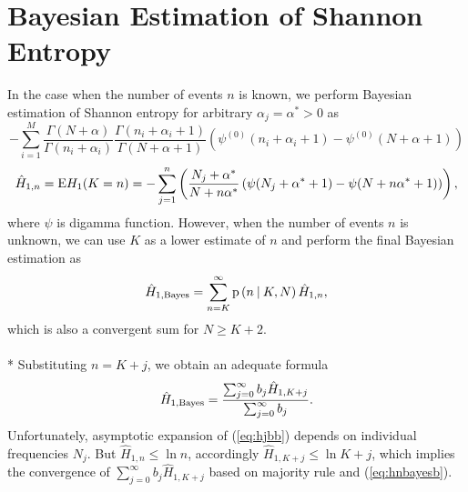 \section {Bayesian Estimation of Shannon Entropy}
In the case when the number of events $n$ is known, we perform Bayesian estimation of Shannon entropy for arbitrary $\alpha_j = \alpha^{*} > 0$ as
\[ -\sum_{i=1}^M \frac{\Gamma(N+\alpha)}{\Gamma(n_i+\alpha_i)} \frac{\Gamma(n_i+\alpha_i+1)}{\Gamma(N+\alpha+ 1)}\left(\psi^{(0)}(n_i+\alpha_i+1) -\psi^{(0)}(N+\alpha+ 1) \right) \]
\begin{equation} 
\label{eq:hjednan}
\hat{H}_{1,\scriptsize{n}} = \text{E}H_{1}(K=n) = -\sum_{j=1}^{n} \left( \frac{N_{j}+\alpha^*}{N+n\alpha^*} \left( \psi(N_{j}+\alpha^*+1) - \psi(N+n\alpha^*+1) \right) \right),
\end{equation}
where $\psi$ is digamma function. However, when the number of events $n$ is unknown, we can use $K$ as a lower estimate of $n$ and perform the final Bayesian estimation as
\begin{equation} 
\label{eq:hjednab}
\hat{H}_{1,\mbox{\scriptsize{Bayes}}} = \sum_{n=K}^{\infty}{\text{p}\left(n \: \middle| \:K,N \right)\hat{H}_{1,\scriptsize{n}}},
\end{equation}
which is also a convergent sum for $N \ge K+2$. \\
\\*
Substituting $n=K+j$, we obtain an adequate formula
\begin{equation} 
\label{eq:hjbb}
\hat{H}_{1,\mbox{\scriptsize{Bayes}}} = \frac{\sum_{j=0}^{\infty}b_{j}\hat{H}_{1,K+j}}{\sum_{j=0}^{\infty}b_{j}}.
\end{equation}
Unfortunately, asymptotic expansion of (\ref{eq:hjbb}) depends on individual frequencies $N_{j}$. But $\hat{H}_{1,n} \leq \ln{n}$, accordingly $\hat{H}_{1,K+j} \leq \ln{K+j}$, which implies the convergence of $\sum_{j=0}^{\infty}b_{j}\hat{H}_{1,K+j}$ based on majority rule and (\ref{eq:hnbayesb}).